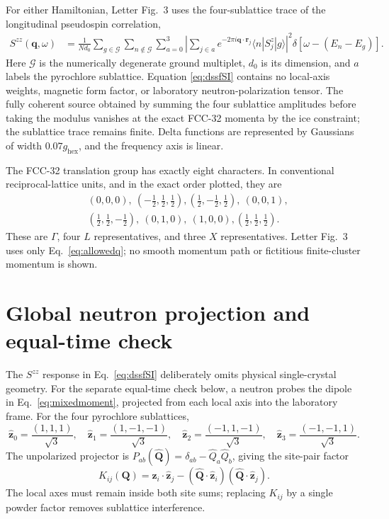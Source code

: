 \documentclass[aps,prl,onecolumn,amsmath,amssymb,superscriptaddress]{revtex4-2}
\newcommand{\ghex}{g_{\mathrm{hex}}}
\newcommand{\bq}{\bm q}
\newcommand{\br}{\bm r}
\begin{document}
For either Hamiltonian, Letter Fig.~3 uses the four-sublattice trace of the
longitudinal pseudospin correlation,
\begin{align}
 S^{zz}(\bq,\omega)&=\frac1{Nd_0}\sum_{g\in\mathcal G}
 \sum_{n\notin\mathcal G}\sum_{a=0}^{3}
 \left|\sum_{j\in a}e^{-2\pi i\bq\cdot\br_j}
 \langle n|S_j^z|g\rangle\right|^2
 \delta[\omega-(E_n-E_g)].
\label{eq:dssfSI}
\end{align}
Here $\mathcal G$ is the numerically degenerate ground multiplet, $d_0$ is
its dimension, and $a$ labels the pyrochlore sublattice. Equation
\eqref{eq:dssfSI} contains no local-axis weights, magnetic form factor, or
laboratory neutron-polarization tensor. The fully coherent source obtained by
summing the four sublattice amplitudes before taking the modulus vanishes at
the exact FCC-32 momenta by the ice constraint; the sublattice trace remains
finite. Delta functions are represented by Gaussians of width
$0.07\ghex$, and the frequency axis is linear.

The FCC-32 translation group has exactly eight characters. In conventional
reciprocal-lattice units, and in the exact order plotted, they are
\begin{equation}
\begin{split}
 &(0,0,0),\ (-\tfrac12,\tfrac12,\tfrac12),
 (\tfrac12,-\tfrac12,\tfrac12),\ (0,0,1),\\
 &(\tfrac12,\tfrac12,-\tfrac12),\ (0,1,0),\ (1,0,0),
 (\tfrac12,\tfrac12,\tfrac12).
\end{split}
\label{eq:allowedq}
\end{equation}
These are $\Gamma$, four $L$ representatives, and three $X$
representatives. Letter Fig.~3 uses only Eq.~\eqref{eq:allowedq}; no smooth
momentum path or fictitious finite-cluster momentum is shown.

\section{Global neutron projection and equal-time check}
\label{sec:neutron}

The $S^{zz}$ response in Eq.~\eqref{eq:dssfSI} deliberately omits physical
single-crystal geometry. For the separate equal-time check below, a neutron
probes the dipole in Eq.~\eqref{eq:mixedmoment}, projected from each local axis
into the laboratory frame. For the four pyrochlore sublattices,
\begin{equation}
 \hat{\bm z}_0=\frac{(1,1,1)}{\sqrt3},\quad
 \hat{\bm z}_1=\frac{(1,-1,-1)}{\sqrt3},\quad
 \hat{\bm z}_2=\frac{(-1,1,-1)}{\sqrt3},\quad
 \hat{\bm z}_3=\frac{(-1,-1,1)}{\sqrt3}.
\end{equation}
The unpolarized projector is
$P_{ab}(\hat{\bm Q})=\delta_{ab}-\hat Q_a\hat Q_b$, giving the site-pair
factor
\begin{equation}
 K_{ij}(\bm Q)=\hat{\bm z}_i\cdot\hat{\bm z}_j-
 (\hat{\bm Q}\cdot\hat{\bm z}_i)
 (\hat{\bm Q}\cdot\hat{\bm z}_j).
\label{eq:Kij}
\end{equation}
The local axes must remain inside both site sums; replacing $K_{ij}$ by a
single powder factor removes sublattice interference.
\end{document}
